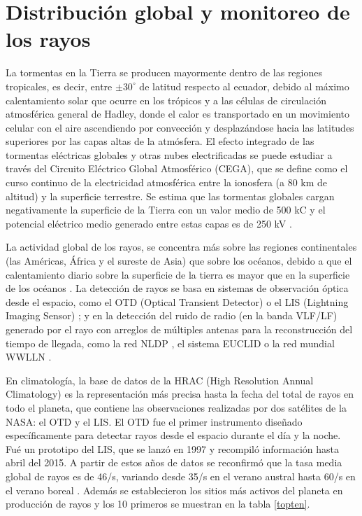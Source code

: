 \documentclass[12pt,oneside,openany,letter]{book}
\begin{document}
\section{Distribución global y monitoreo de los rayos}
La tormentas en la Tierra se producen mayormente dentro de las regiones tropicales, es decir, entre $\pm 30^{\circ}$ de latitud respecto al ecuador, debido al máximo calentamiento solar que ocurre en los trópicos y a las células de circulación atmosférica general de Hadley, donde el calor es transportado en un movimiento celular con el aire ascendiendo por convección y desplazándose hacia las latitudes superiores por las capas altas de la atmósfera. El efecto integrado de las tormentas eléctricas globales y otras nubes electrificadas se puede estudiar a través del Circuito Eléctrico Global Atmosférico (CEGA), que se define como el curso continuo de la electricidad atmosférica entre la ionosfera (a 80 km de altitud) y la superficie terrestre. Se estima que las tormentas globales cargan negativamente la superficie de la Tierra con un valor medio de 500 kC y el potencial eléctrico medio generado entre estas capas es de 250 kV \cite{FullekrugEtal2006}. 

La actividad global de los rayos, se concentra más sobre las regiones continentales (las Américas, África y el sureste de Asia) que sobre los océanos, debido a que el calentamiento diario sobre la superficie de la tierra es mayor que en la superficie de los océanos \cite{FullekrugEtal2006}. La detección de rayos se basa en sistemas de observación óptica desde el espacio, como el OTD (Optical Transient Detector) \cite{ChristianEtal2003} o el LIS (Lightning Imaging Sensor) \cite{Christian1992}; y en la detección del ruido de radio (en la banda VLF/LF) generado por el rayo con arreglos de múltiples antenas para la reconstrucción del tiempo de llegada, como la red NLDP \cite{CumminsEtal1998}, el sistema EUCLID \cite{SchulzEtal2016} o la red mundial WWLLN \cite{RodgerEtal2004}.

En climatología, la base de datos de la HRAC (High Resolution Annual Climatology) \cite{AlbrechtEtal2016} es la representación más precisa hasta la fecha del total de rayos en todo el planeta, que contiene las observaciones realizadas por dos satélites de la NASA: el OTD y el LIS. El OTD fue el primer instrumento diseñado específicamente para detectar rayos desde el espacio durante el día y la noche. Fu\'e un prototipo del LIS, que se lanzó en 1997 y recompiló información hasta abril del 2015. A partir de estos años de datos se reconfirmó que la tasa media global de rayos es de 46/s, variando desde 35/s en el verano austral hasta 60/s en el verano boreal \cite{AlbrechtEtal2016}. Además se establecieron los sitios más activos del planeta en producción de rayos y los 10 primeros se muestran en la tabla \ref{topten}.
\end{document}
